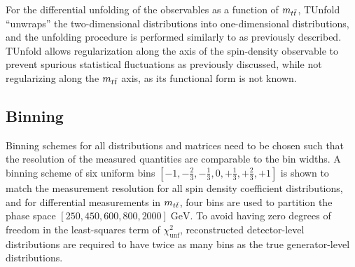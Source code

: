 
For the differential unfolding of the observables as a function of $m_{t\bar{t}}$, TUnfold ``unwraps'' the two-dimensional distributions into one-dimensional distributions, and the unfolding procedure is performed similarly to as previously described. 
TUnfold allows regularization along the axis of the spin-density observable to prevent spurious statistical fluctuations as previously discussed, while not regularizing along the $m_{t\bar{t}}$ axis, as its functional form is not known.


\subsection{Binning}
\label{Binning}
Binning schemes for all distributions and matrices need to be chosen such that the resolution of the measured quantities are comparable to the bin widths.
A binning scheme of six uniform bins $[-1,-\frac{2}{3},-\frac{1}{3},0,+\frac{1}{3},+\frac{2}{3},+1]$ is shown to match the measurement resolution for all spin density coefficient distributions, and for differential measurements in $m_{t\bar{t}}$, four bins are used to partition the phase space $[250,450,600,800,2000] \; \si{\GeV}$.
To avoid having zero degrees of freedom in the least-squares term of $\chi^{2}_{\text{unf}}$, reconstructed detector-level distributions are required to have twice as many bins as the true generator-level distributions.

